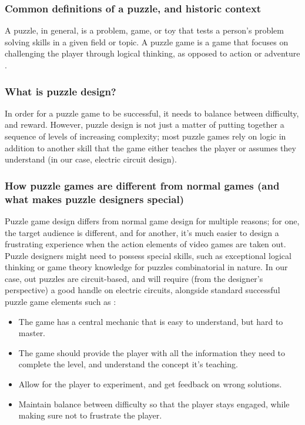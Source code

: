 \documentclass[../main.tex]{subfiles}
\begin{document}
\subsubsection{Common definitions of a puzzle, and historic context}
A puzzle, in general, is a problem, game, or toy that tests a person’s problem solving skills in a given field or topic. A puzzle game is a game that focuses on challenging the player through logical thinking, as opposed to action or adventure \cite{15}.

\subsubsection{What is puzzle design?}
In order for a puzzle game to be successful, it needs to balance between difficulty, and reward. However, puzzle design is not just a matter of putting together a sequence of levels of increasing complexity; most puzzle games rely on logic in addition to another skill that the game either teaches the player or assumes they understand (in our case, electric circuit design). 

\subsubsection{How puzzle games are different from normal games (and what makes puzzle designers special)}
Puzzle game design differs from normal game design for multiple reasons; for one, the target audience is different, and for another, it’s much easier to design a frustrating experience when the action elements of video games are taken out. Puzzle designers might need to possess special skills, such as exceptional logical thinking or game theory knowledge for puzzles combinatorial in nature. In our case, out puzzles are circuit-based, and will require (from the designer’s perspective) a good handle on electric circuits, alongside standard successful puzzle game elements such as \cite{16}:
\begin{itemize}
    \item The game has a central mechanic that is easy to understand, but hard to master.
    \item The game should provide the player with all the information they need to complete the level, and understand the concept it’s teaching.
    \item Allow for the player to experiment, and get feedback on wrong solutions.
    \item Maintain balance between difficulty so that the player stays engaged, while making sure not to frustrate the player.
\end{itemize}
\end{document}
